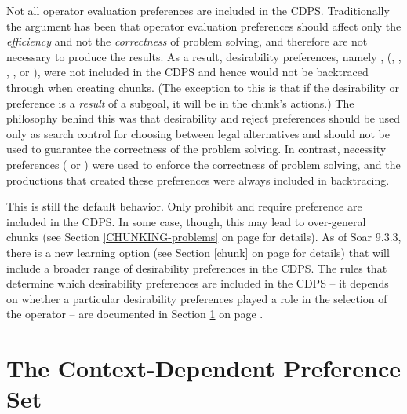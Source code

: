 Not all operator evaluation preferences are included in the CDPS.
Traditionally the argument has been that operator evaluation preferences should
affect only the \emph{efficiency} and not the \emph{correctness} of problem
solving, and therefore are not necessary to produce the results. As a result,
desirability preferences, namely , (,
, , , or ), were not included
in the CDPS and hence would not be backtraced through when creating chunks. (The
exception to this is that if the desirability or  preference is a
{\em result} of a subgoal, it will be in the chunk's actions.) The philosophy
behind this was that desirability and reject preferences should be used only as
search control for choosing between legal alternatives and should not be used to
guarantee the correctness of the problem solving. In contrast, necessity
preferences ( or ) were used to enforce the
correctness of problem solving, and the productions that created these
preferences were always included in backtracing.

This is still the default behavior.  Only prohibit and require preference are
included in the CDPS. In some case, though, this may lead to over-general chunks
(see Section \ref{CHUNKING-problems} on page \pageref{CHUNKING-problems} for
details).  As of Soar 9.3.3, there is a new learning option (see Section
\ref{chunk} on page \pageref{chunk} for details) that will include a broader
range of desirability preferences in the CDPS. The rules
that determine which desirability preferences are included in the CDPS -- it
depends on whether a particular desirability preferences played a
role in the selection of the operator -- are documented in
Section \ref{CDPS} on page \pageref{CDPS}.

\section{The Context-Dependent Preference Set}
\label{CDPS}

